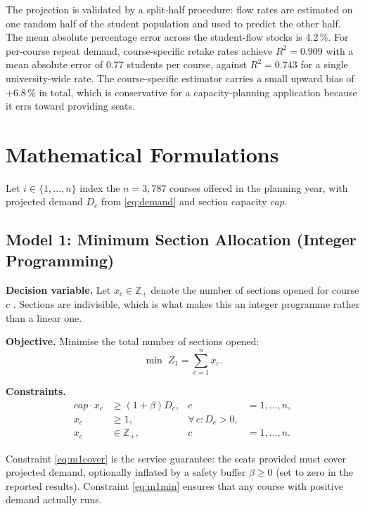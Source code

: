 \documentclass[conference]{IEEEtran}
\begin{document}
The projection is validated by a split-half procedure: flow rates are estimated on one
random half of the student population and used to predict the other half. The mean
absolute percentage error across the student-flow stocks is 4.2\,\%. For per-course
repeat demand, course-specific retake rates achieve $R^2 = 0.909$ with a mean absolute
error of 0.77 students per course, against $R^2 = 0.743$ for a single university-wide
rate. The course-specific estimator carries a small upward bias of $+6.8\,\%$ in total,
which is conservative for a capacity-planning application because it errs toward
providing seats.

\section{Mathematical Formulations}

Let $i \in \{1,\dots,n\}$ index the $n = 3{,}787$ courses offered in the planning year,
with projected demand $D_c$ from \eqref{eq:demand} and section capacity $cap$.

\subsection{Model 1: Minimum Section Allocation (Integer Programming)}

\textbf{Decision variable.} Let $x_c \in \mathbb{Z}_+$ denote the number of sections
opened for course $c$ \cite{nemhauser}. Sections are indivisible, which is what makes this an integer
programme rather than a linear one.

\textbf{Objective.} Minimise the total number of sections opened:
\begin{equation}
\min \; Z_1 = \sum_{c=1}^{n} x_c .
\label{eq:m1obj}
\end{equation}

\textbf{Constraints.}
\begin{align}
cap \cdot x_c &\ge (1+\beta) D_c, & c &= 1,\dots,n, \label{eq:m1cover}\\
x_c &\ge 1, & \forall\, c : D_c > 0, \label{eq:m1min}\\
x_c &\in \mathbb{Z}_+, & c &= 1,\dots,n. \label{eq:m1int}
\end{align}

Constraint \eqref{eq:m1cover} is the service guarantee: the seats provided must cover
projected demand, optionally inflated by a safety buffer $\beta \ge 0$ (set to zero in
the reported results). Constraint \eqref{eq:m1min} ensures that any course with positive
demand actually runs.
\end{document}
